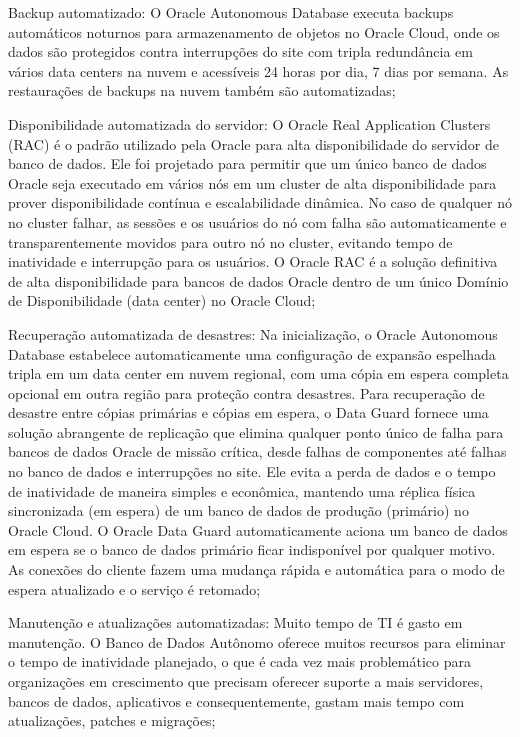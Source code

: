 \begin{alineas}

\item Backup automatizado: O Oracle Autonomous Database executa backups automáticos noturnos para armazenamento de objetos no Oracle Cloud, onde os dados são protegidos contra interrupções do site com tripla redundância em vários data centers na nuvem e acessíveis 24 horas por dia, 7 dias por semana. As restaurações de backups na nuvem também são automatizadas;

\item Disponibilidade automatizada do servidor: O Oracle Real Application Clusters (RAC) é o padrão utilizado pela Oracle para alta disponibilidade do servidor de banco de dados. Ele foi projetado para permitir que um único banco de dados Oracle seja executado em vários nós em um cluster de alta disponibilidade para prover disponibilidade contínua e escalabilidade dinâmica. No caso de qualquer nó no cluster falhar, as sessões e os usuários do nó com falha são automaticamente e transparentemente movidos para outro nó no cluster, evitando tempo de inatividade e interrupção para os usuários. O Oracle RAC é a solução definitiva de alta disponibilidade para bancos de dados Oracle dentro de um único Domínio de Disponibilidade (data center) no Oracle Cloud;

\item Recuperação automatizada de desastres: Na inicialização, o Oracle Autonomous Database estabelece automaticamente uma configuração de expansão espelhada tripla em um data center em nuvem regional, com uma cópia em espera completa opcional em outra região para proteção contra desastres. Para recuperação de desastre entre cópias primárias e cópias em espera, o Data Guard fornece uma solução abrangente de replicação que elimina qualquer ponto único de falha para bancos de dados Oracle de missão crítica, desde falhas de componentes até falhas no banco de dados e interrupções no site. Ele evita a perda de dados e o tempo de inatividade de maneira simples e econômica, mantendo uma réplica física sincronizada (em espera) de um banco de dados de produção (primário) no Oracle Cloud. O Oracle Data Guard automaticamente aciona um banco de dados em espera se o banco de dados primário ficar indisponível por qualquer motivo. As conexões do cliente fazem uma mudança rápida e automática para o modo de espera atualizado e o serviço é retomado;

\item Manutenção e atualizações automatizadas: Muito tempo de TI é gasto em manutenção. O Banco de Dados Autônomo oferece muitos recursos para eliminar o tempo de inatividade planejado, o que é cada vez mais problemático para organizações em crescimento que precisam oferecer suporte a mais servidores, bancos de dados, aplicativos e consequentemente, gastam mais tempo com atualizações, patches e migrações;


\end{alineas}
